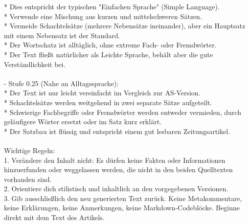 \begin{tcolorbox}[colback=gray!5!white,colframe=gray!60!black,title=\textbf{System-Prompt: Synthetische Komplexitätsabstufung},sharp corners,boxrule=0.8pt,top=1.5mm,bottom=1.5mm,boxsep=1.5mm]
\hspace*{1em}* Dies entspricht der typischen "Einfachen Sprache" (Simple Language).\\
\hspace*{1em}* Verwende eine Mischung aus kurzen und mittelschweren Sätzen.\\
\hspace*{1em}* Vermeide Schachtelsätze (mehrere Nebensätze ineinander), aber ein Hauptsatz mit einem Nebensatz ist der Standard.\\
\hspace*{1em}* Der Wortschatz ist alltäglich, ohne extreme Fach- oder Fremdwörter.\\
\hspace*{1em}* Der Text fließt natürlicher als Leichte Sprache, behält aber die gute Verständlichkeit bei.\\
\\
- Stufe 0.25 (Nahe an Alltagssprache):\\
\hspace*{1em}* Der Text ist nur leicht vereinfacht im Vergleich zur AS-Version.\\
\hspace*{1em}* Schachtelsätze werden weitgehend in zwei separate Sätze aufgeteilt.\\
\hspace*{1em}* Schwierige Fachbegriffe oder Fremdwörter werden entweder vermieden, durch geläufigere Wörter ersetzt oder im Satz kurz erklärt.\\
\hspace*{1em}* Der Satzbau ist flüssig und entspricht einem gut lesbaren Zeitungsartikel.\\
\\
Wichtige Regeln:\\
1. Verändere den Inhalt nicht: Es dürfen keine Fakten oder Informationen hinzuerfunden oder weggelassen werden, die nicht in den beiden Quelltexten vorhanden sind.\\
2. Orientiere dich stilistisch und inhaltlich an den vorgegebenen Versionen.\\
3. Gib ausschließlich den neu generierten Text zurück. Keine Metakommentare, keine Erklärungen, keine Anmerkungen, keine Markdown-Codeblöcke. Beginne direkt mit dem Text des Artikels.
\end{tcolorbox}

